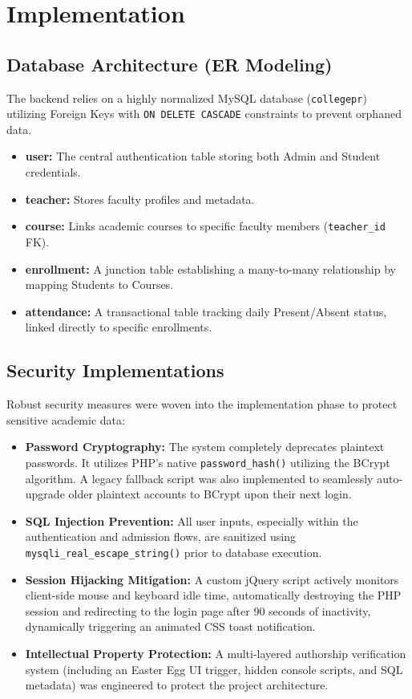 \documentclass[12pt, a4paper]{report}
\begin{document}
\chapter{Implementation}

\section{Database Architecture (ER Modeling)}
The backend relies on a highly normalized MySQL database (\texttt{collegepr}) utilizing Foreign Keys with \texttt{ON DELETE CASCADE} constraints to prevent orphaned data.
\begin{itemize}
    \item \textbf{user:} The central authentication table storing both Admin and Student credentials.
    \item \textbf{teacher:} Stores faculty profiles and metadata.
    \item \textbf{course:} Links academic courses to specific faculty members (\texttt{teacher\_id} FK).
    \item \textbf{enrollment:} A junction table establishing a many-to-many relationship by mapping Students to Courses.
    \item \textbf{attendance:} A transactional table tracking daily Present/Absent status, linked directly to specific enrollments.
\end{itemize}

\section{Security Implementations}
Robust security measures were woven into the implementation phase to protect sensitive academic data:
\begin{itemize}
    \item \textbf{Password Cryptography:} The system completely deprecates plaintext passwords. It utilizes PHP's native \texttt{password\_hash()} utilizing the BCrypt algorithm. A legacy fallback script was also implemented to seamlessly auto-upgrade older plaintext accounts to BCrypt upon their next login.
    \item \textbf{SQL Injection Prevention:} All user inputs, especially within the authentication and admission flows, are sanitized using \texttt{mysqli\_real\_escape\_string()} prior to database execution.
    \item \textbf{Session Hijacking Mitigation:} A custom jQuery script actively monitors client-side mouse and keyboard idle time, automatically destroying the PHP session and redirecting to the login page after 90 seconds of inactivity, dynamically triggering an animated CSS toast notification.
    \item \textbf{Intellectual Property Protection:} A multi-layered authorship verification system (including an Easter Egg UI trigger, hidden console scripts, and SQL metadata) was engineered to protect the project architecture.
\end{itemize}
\end{document}

